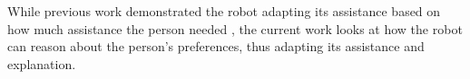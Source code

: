 \documentclass[letterpaper]{article} %
\begin{document}
While previous work demonstrated the robot adapting its assistance based on how much assistance the person needed \cite{wilson2020challenges}, the current work looks at how the robot can reason about the person's preferences, thus adapting its assistance and explanation.






\end{document}
